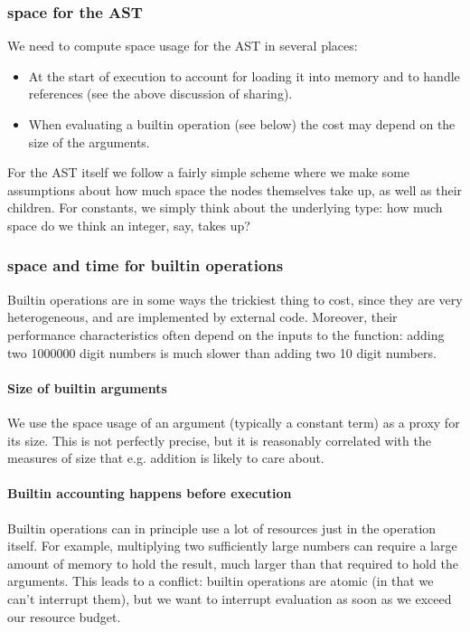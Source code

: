 \subsubsection{\gls{space} for the AST}
We need to compute \gls{space} usage for the AST in several places:
\begin{itemize}
\item At the start of execution to account for loading it into memory and to handle references (see the above discussion of sharing).
\item When evaluating a builtin operation (see below) the cost may depend on the size of  the arguments.
\end{itemize}

For the AST itself we follow a fairly simple scheme where we make some assumptions about how much space the nodes themselves take up, as well as their children.
For constants, we simply think about the underlying type: how much space do we think an integer, say, takes up?

\subsubsection{\gls{space} and \gls{time} for builtin operations}
Builtin operations are in some ways the trickiest thing to cost, since they are very heterogeneous, and are implemented by external code.
Moreover, their performance characteristics often depend on the inputs to the function: adding two 1000000 digit numbers is much slower than adding two 10 digit numbers.

\paragraph{Size of builtin arguments}
We use the \gls{space} usage of an argument (typically a constant term) as a proxy for its size.
This is not perfectly precise, but it is reasonably correlated with the measures of size that e.g. addition is likely to care about.

\paragraph{Builtin accounting happens before execution}
Builtin operations can in principle use a lot of resources just in the operation itself.
For example, multiplying two sufficiently large numbers can require a large amount of memory to hold the result, much larger than that required to hold the arguments.
This leads to a conflict: builtin operations are atomic (in that we can't interrupt them), but we want to interrupt evaluation as soon as we exceed our resource budget.

